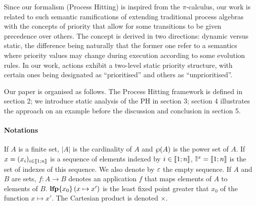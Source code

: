 Since our formalism (Process Hitting) is inspired from the $\pi$-calculus, our work is related to such semantic ramifications of extending traditional process algebras with the concepts of priority that allow for some transitions to be given precedence over others.
The concept is derived in two directions: dynamic versus static, the difference being naturally that the former one refer to a semantics where priority values may change during execution according to some evolution rules.
In our work, actions exhibit a two-level static priority structure, with certain ones being designated as “prioritised” and others as “unprioritised”.

Our paper is organised as follows.
The Process Hitting framework is defined in section 2;
we introduce static analysis of the PH in section 3;
section 4 illustrates the approach on an example
before the discussion and conclusion in section 5. 



\paragraph*{Notations}

If $A$ is a finite set,
$|A|$ is the cardinality of $A$
and $\wp(A)$ is the power set of $A$.
If $x = (x_i)_{i \in \llbracket 1; n \rrbracket}$ is a sequence of elements indexed by $i \in \llbracket 1; n \rrbracket$,
$\mathbb{I}^{x} = \llbracket 1; n \rrbracket$ is the set of indexes of this sequence.
We also denote by $\varepsilon$ the empty sequence.
If $A$ and $B$ are sets,
$f : A \rightarrow B$ denotes an application $f$ that maps elements of $A$ to elements of $B$.
$\mathbf{lfp}\{x_0\}\left(x\mapsto x'\right)$ is the least fixed point greater that $x_0$ of the function $x \mapsto x'$.
The Cartesian product is denoted $\times$.
